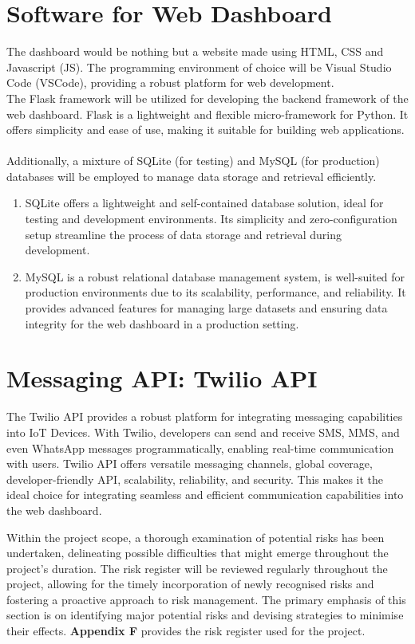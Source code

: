 \section{Software for Web Dashboard}
The dashboard would be nothing but a website made using HTML, CSS and Javascript (JS). The programming environment of choice will be Visual Studio Code (VSCode), providing a robust platform for web development. \\

\noindent The Flask framework will be utilized for developing the backend framework of the web dashboard. Flask is a lightweight and flexible micro-framework for Python. It offers simplicity and ease of use, making it suitable for building web applications. \\ \\
Additionally, a mixture of SQLite (for testing) and MySQL (for production) databases will be employed to manage data storage and retrieval efficiently. 
\begin{enumerate}
    \item SQLite offers a lightweight and self-contained database solution, ideal for testing and development environments. Its simplicity and zero-configuration setup streamline the process of data storage and retrieval during development.
    \item MySQL is a robust relational database management system, is well-suited for production environments due to its scalability, performance, and reliability. It provides advanced features for managing large datasets and ensuring data integrity for the web dashboard in a production setting.
\end{enumerate}

\section{Messaging API: Twilio API}
The Twilio API provides a robust platform for integrating messaging capabilities into IoT Devices. With Twilio, developers can send and receive SMS, MMS, and even WhatsApp messages programmatically, enabling real-time communication with users. Twilio API offers versatile messaging channels, global coverage, developer-friendly API, scalability, reliability, and security. This makes it the ideal choice for integrating seamless and efficient communication capabilities into the web dashboard.

\noindent Within the project scope, a thorough examination of potential risks has been undertaken, delineating possible difficulties that might emerge throughout the project’s duration. The risk register will be reviewed regularly throughout the project, allowing for the timely incorporation of newly recognised risks and fostering a proactive approach to risk management.  The primary emphasis of this section is on identifying major potential risks and devising strategies to minimise their effects. \textbf{Appendix F} provides the risk register used for the project.

